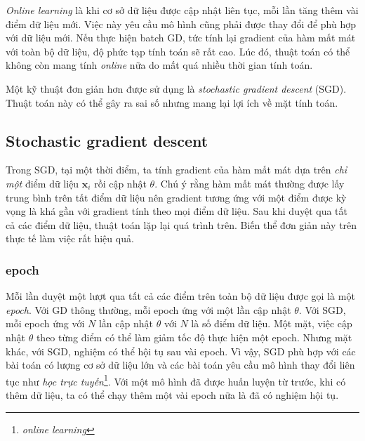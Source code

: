 
\textit{Online learning} là khi cơ sở dữ liệu được cập nhật liên tục, mỗi lần
tăng thêm vài điểm dữ liệu mới. Việc này yêu cầu mô
hình cũng phải được thay đổi để phù hợp với dữ liệu mới. Nếu thực hiện
batch GD, tức tính lại gradient của hàm mất mát với toàn bộ dữ liệu, độ
phức tạp tính toán sẽ rất cao. Lúc đó, thuật toán có thể không còn mang tính
\textit{online} nữa do mất quá nhiều thời gian tính toán.

Một kỹ thuật đơn giản hơn được sử dụng là \textit{stochastic gradient descent}
(SGD). Thuật toán này có thể gây ra sai số nhưng mang lại lợi ích về mặt tính
toán.


\subsection{Stochastic gradient descent}
Trong SGD, tại một thời điểm, ta tính gradient của hàm
mất mát dựa trên \textit{chỉ một} điểm dữ liệu $\mathbf{x}_i$ rồi cập nhật
$\theta$. Chú ý rằng hàm mất mát thường được lấy trung bình
trên tất điểm dữ liệu nên gradient tương ứng với một điểm {được kỳ vọng} là khá
gần với gradient tính theo mọi điểm dữ liệu. Sau khi duyệt qua tất cả
các điểm dữ liệu, thuật toán lặp lại quá trình trên. Biến thể đơn giản này trên
thực tế làm việc rất hiệu quả.


\subsubsection{epoch}
Mỗi lần duyệt một lượt qua {tất cả} các điểm trên toàn bộ dữ liệu được gọi là
một \textit{epoch}. Với GD thông thường, mỗi epoch ứng với một lần cập nhật
$\theta$. Với SGD, mỗi epoch ứng với $N$ lần cập nhật $\theta$ với $N$ là số
điểm dữ liệu. Một mặt, việc cập nhật $\theta$ theo từng điểm có thể làm giảm tốc
độ thực hiện một epoch. Nhưng mặt khác, với SGD, nghiệm có thể hội tụ sau vài
epoch. Vì vậy, SGD phù hợp với các bài toán có lượng cơ sở dữ liệu lớn và các
bài toán yêu cầu mô hình thay đổi liên tục như \textit{học trực
tuyến}\footnote{\textit{online learning}}. Với một mô hình đã được huấn luyện từ
trước, khi có thêm dữ liệu, ta có thể chạy thêm một vài epoch nữa là đã có
nghiệm hội tụ.

